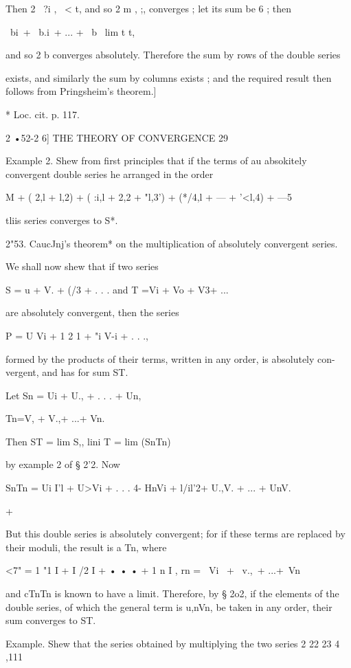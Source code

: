Then 2 \ ?i , \ < t, and so 2 m , ;, converges ; let its sum be 6 ;
then

\ bi\ + \ b.i\ + ... + \ b \ lim t t,

and so 2 b converges absolutely. Therefore the sum by rows of the
double series

exists, and similarly the sum by columns exists ; and the required
result then follows from Pringsheim's theorem.]

* Loc. cit. p. 117.



2 •52-2 6] THE THEORY OF CONVERGENCE 29

Example 2. Shew from first principles that if the terms of au
absokitely convergent double series he arranged in the order

 M + ( 2,l + l,2) + ( :i,l + 2,2 + "l,3') + (*/4,l + --- + '<l,4) +
---5

tliis series converges to S*.

2"53. CaucJnj's theorem* on the multiplication of absolutely
convergent series.

We shall now shew that if two series

S = u + V. + (/3 + . . . and T =Vi + Vo + V3+ ...

are absolutely convergent, then the series

P = U Vi + 1 2 1 + "i V-i + . . .,

formed by the products of their terms, written in any order, is
absolutely con- vergent, and has for sum ST.

Let Sn = Ui + U., + . . . + Un,

Tn=V, + V.,+ ...+ Vn.

Then ST = lim S,, lini T = lim (SnTn)

by example 2 of § 2'2. Now

SnTn = Ui I'l + U>Vi + . . . 4- HnVi + l/il'2+ U.,V. + ... + UnV.

+

But this double series is absolutely convergent; for if these terms
are replaced by their moduli, the result is a Tn, where

<7" = 1 "1 I + I /2 I + • • • + 1 n I , rn = \ Vi \ + \ v.,\ + ...+\
Vn\,

and cTnTn is known to have a limit. Therefore, by § 2o2, if the
elements of the double series, of which the general term is u,nVn, be
taken in any order, their sum converges to ST.

Example. Shew that the series obtained by multiplying the two series 2
22 23 4 ,111


